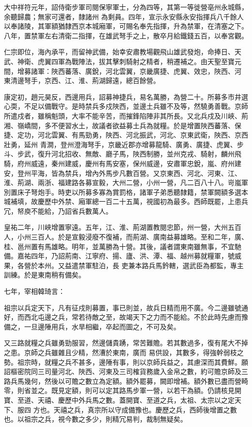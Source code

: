 \begin{pinyinscope}
 大中祥符元年，詔侍衛步軍司閱保寧軍士，分為四等，其第一等徙營亳州永城縣，余聽歸農；無家可還者，隸諸州
 為剩員。四年，宣示永安縣永安指揮兵八千餘人以奉諸陵，其軍額猶隸西京本城廂軍，可賜名奉先指揮，升為禁軍，在清塞之下。八年，置禁軍左右清衛二指揮，在雄武弩手之上，散卒月給鐵錢五百，以奉宮觀。



 仁宗即位，海內承平，而留神武備，始幸安肅教場觀飛山雄武發炮，命捧日、天武、神衛、虎翼四軍為戰陣法，拔其擊刺騎射之精者，稍遷補之。由天聖至寶元間，增募諸軍：陜西蕃落、廣銳，河北雲翼，京畿廣捷、虎翼、效忠，陜西、河
 東清邊弩手，京西、江、淮、荊湖歸遠，總百餘營。



 康定初，趙元昊反，西邊用兵，詔募神捷兵，易名萬勝，為營二十。所募多市井選心耎，不足以備戰守。是時禁兵多戍陜西，並邊土兵雖不及等，然驍勇善戰。京師所遣戍者，雖稱魁頭，大率不能辛苦，而摧鋒陷陣非其所長。又北兵戍及川峽、荊湘、嶺嶠間，多不便習水土，故議者欲益募土兵為就糧。於是增置陜西蕃落、保捷、定功，河北雲翼、有馬勁勇，陜西、河北振武，河北、京東武衛，陜西、京西壯勇，延州
 青澗，登州澄海弩手，京畿近郡亦增募龍騎、廣勇、廣捷、虎翼、步斗、步武，復升河北招收、無敵、廳子馬，陜西制勝，並州克戎、騎射，麟州飛騎，府州威遠，秦州建威，慶州有馬安塞，保州威邊，安肅軍忠銳，嵐、府州建安，登州平海，皆為禁兵，增內外馬步凡數百營。又京東西、河北、河東、江、淮、荊湖、兩浙、福建路各募宣毅，大州二營，小州一營，凡二百八十八。岢嵐軍別置床子弩炮手。時吏以所募多寡為賞罰格，諸軍子弟悉聽隸籍，禁軍闕額多選本
 城補填，故慶歷中外禁、廂軍總一百二十五萬，視國初為最多。西師既罷，上患兵冗，帑庾不能給，乃詔省兵數萬人。



 皇祐二年，川峽增置寧遠。五年，江、淮、荊湖置教閱忠節，州一營，大州五百人，小州三百人。於是宣毅浸廢不復補，而荊湖、廣南益募雄略。至和二年，廣、桂、邕州置有馬雄略。明年，並萬勝為十營。其後，議者謂東南雖無事，不宜馳備。嘉祐四年，乃詔荊南、江寧府、揚、廬、洪、潭、福、越州募就糧軍，號威果，各營於本州。又益遣禁軍駐泊，長
 吏兼本路兵馬鈐轄，選武臣為都監，專主訓練。於是東南稍有備矣。



 七年，宰相韓琦言：



 祖宗以兵定天下，凡有征戍則募置，事已則並，故兵日精而用不廣。今二邊雖號通好，而西北屯邊之兵，常若待敵之至，故竭天下之力而不能給。不於此時先慮而豫備之，一旦邊陲用兵，水旱相繼，卒起而圖之，不可及矣。



 又三路就糧之兵雖勇勁服習，然邊儲貴踴，常苦難贍。若其數過多，復有尾大不掉之患。京師之兵雖雜且少精，然漕於東南，廣而
 易供設，其數多，得強幹弱枝之勢。祖宗時，就糧之兵不甚多，邊陲有事，則以京師兵益之，其慮深而其費鮮。願詔樞密院同三司量河北、陜西、河東及三司榷貨務歲入金帛之數，約可贍京師及三路兵馬幾何，然後以可贍之數立為定額。額外罷募，闕即增補。額外數已盡而營畸零，則省並之。既見定額，則可以定其路馬步軍一營，以若干為額。仍請核見開寶、至道、天禧、慶歷中外兵馬之數。蓋開寶、至道之兵，太祖、太宗以之定天下、服四
 方也。天禧之兵，真宗所以守成備豫也。慶歷之兵，西師後增置之數也。以祖宗之兵，視今數之多少，則精冗易判，裁制無疑矣。




\end{pinyinscope}
